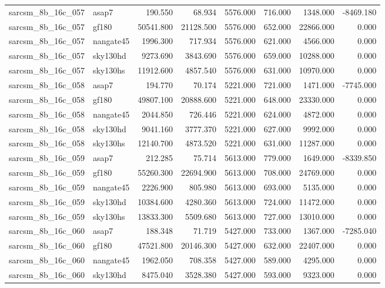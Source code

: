 \begin{tabular}{llrrrrrr}
sarcsm\_8b\_16c\_057 & asap7 & 190.550 & 68.934 & 5576.000 & 716.000 & 1348.000 & -8469.180 \\
sarcsm\_8b\_16c\_057 & gf180 & 50541.800 & 21128.500 & 5576.000 & 652.000 & 22866.000 & 0.000 \\
sarcsm\_8b\_16c\_057 & nangate45 & 1996.300 & 717.934 & 5576.000 & 621.000 & 4566.000 & 0.000 \\
sarcsm\_8b\_16c\_057 & sky130hd & 9273.690 & 3843.690 & 5576.000 & 659.000 & 10288.000 & 0.000 \\
sarcsm\_8b\_16c\_057 & sky130hs & 11912.600 & 4857.540 & 5576.000 & 631.000 & 10970.000 & 0.000 \\
sarcsm\_8b\_16c\_058 & asap7 & 194.770 & 70.174 & 5221.000 & 721.000 & 1471.000 & -7745.000 \\
sarcsm\_8b\_16c\_058 & gf180 & 49807.100 & 20888.600 & 5221.000 & 648.000 & 23330.000 & 0.000 \\
sarcsm\_8b\_16c\_058 & nangate45 & 2044.850 & 726.446 & 5221.000 & 624.000 & 4872.000 & 0.000 \\
sarcsm\_8b\_16c\_058 & sky130hd & 9041.160 & 3777.370 & 5221.000 & 627.000 & 9992.000 & 0.000 \\
sarcsm\_8b\_16c\_058 & sky130hs & 12140.700 & 4873.520 & 5221.000 & 631.000 & 11287.000 & 0.000 \\
sarcsm\_8b\_16c\_059 & asap7 & 212.285 & 75.714 & 5613.000 & 779.000 & 1649.000 & -8339.850 \\
sarcsm\_8b\_16c\_059 & gf180 & 55260.300 & 22694.900 & 5613.000 & 708.000 & 24769.000 & 0.000 \\
sarcsm\_8b\_16c\_059 & nangate45 & 2226.900 & 805.980 & 5613.000 & 693.000 & 5135.000 & 0.000 \\
sarcsm\_8b\_16c\_059 & sky130hd & 10384.600 & 4280.360 & 5613.000 & 724.000 & 11472.000 & 0.000 \\
sarcsm\_8b\_16c\_059 & sky130hs & 13833.300 & 5509.680 & 5613.000 & 727.000 & 13010.000 & 0.000 \\
sarcsm\_8b\_16c\_060 & asap7 & 188.348 & 71.719 & 5427.000 & 733.000 & 1367.000 & -7285.040 \\
sarcsm\_8b\_16c\_060 & gf180 & 47521.800 & 20146.300 & 5427.000 & 632.000 & 22407.000 & 0.000 \\
sarcsm\_8b\_16c\_060 & nangate45 & 1962.050 & 708.358 & 5427.000 & 589.000 & 4295.000 & 0.000 \\
sarcsm\_8b\_16c\_060 & sky130hd & 8475.040 & 3528.380 & 5427.000 & 593.000 & 9323.000 & 0.000 \\

\end{tabular}
